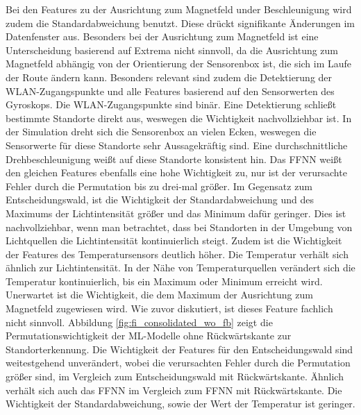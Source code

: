 Bei den Features zu der Ausrichtung zum Magnetfeld under Beschleunigung wird zudem die Standardabweichung benutzt.
Diese drückt signifikante Änderungen im Datenfenster aus.
Besonders bei der Ausrichtung zum Magnetfeld ist eine Unterscheidung basierend auf Extrema nicht sinnvoll,
da die Ausrichtung zum Magnetfeld abhängig von der Orientierung der Sensorenbox ist, die sich im Laufe der Route ändern kann.
\newline
\newline
Besonders relevant sind zudem die Detektierung der WLAN-Zugangspunkte und alle Features basierend auf den Sensorwerten des Gyroskops.
Die WLAN-Zugangspunkte sind binär.
Eine Detektierung schließt bestimmte Standorte direkt aus, weswegen die Wichtigkeit nachvollziehbar ist.
In der Simulation dreht sich die Sensorenbox an vielen Ecken, weswegen die Sensorwerte für diese Standorte sehr Aussagekräftig sind.
Eine durchschnittliche Drehbeschleunigung weißt auf diese Standorte konsistent hin.
\newline
\newline
Das FFNN weißt den gleichen Features ebenfalls eine hohe Wichtigkeit zu, nur ist der verursachte Fehler durch die Permutation bis zu drei-mal größer.
Im Gegensatz zum Entscheidungswald, ist die Wichtigkeit der Standardabweichung und des Maximums der Lichtintensität größer und das Minimum dafür geringer.
Dies ist nachvollziehbar, wenn man betrachtet, dass bei Standorten in der Umgebung von Lichtquellen die Lichtintensität kontinuierlich steigt.
Zudem ist die Wichtigkeit der Features des Temperatursensors deutlich höher.
Die Temperatur verhält sich ähnlich zur Lichtintensität.
In der Nähe von Temperaturquellen verändert sich die Temperatur kontinuierlich, bis ein Maximum oder Minimum erreicht wird.
Unerwartet ist die Wichtigkeit, die dem Maximum der Ausrichtung zum Magnetfeld zugewiesen wird.
Wie zuvor diskutiert, ist dieses Feature fachlich nicht sinnvoll.
\newline
\newline
Abbildung \ref{fig:fi_consolidated_wo_fb} zeigt die Permutationswichtigkeit der ML-Modelle ohne Rückwärtskante zur Standorterkennung.
Die Wichtigkeit der Features für den Entscheidungswald sind weitestgehend unverändert,
wobei die verursachten Fehler durch die Permutation größer sind, im Vergleich zum Entscheidungswald mit Rückwärtskante.
Ähnlich verhält sich auch das FFNN im Vergleich zum FFNN mit Rückwärtskante.
Die Wichtigkeit der Standardabweichung, sowie der Wert der Temperatur ist geringer.
